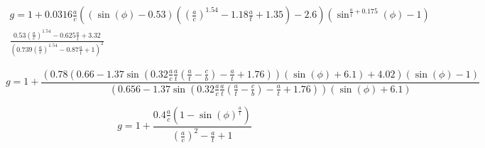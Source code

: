 \begin{equation} \label{eqn:Bingo_g_matching_complexity}
\begin{gathered}
   g = 1 + 0.0316 \frac{a}{c} \left( \left( \sin\left(\phi\right) - 0.53 \right) \left( \left( \frac{a}{c} \right) ^ 1.54 - 1.18 \frac{a}{t} + 1.35 \right) - 2.6 \right) \left( \sin ^{\frac{a}{t} + 0.175}\left(\phi\right) - 1 \right) \\
   \frac{0.53 \left( \frac{a}{c} \right) ^ 1.54 - 0.625 \frac{a}{t} + 3.32}{\left( 0.739 \left( \frac{a}{c} \right) ^ 1.54 - 0.87 \frac{a}{t} + 1 \right) ^ 2} 
\end{gathered}
\end{equation}

\begin{equation} \label{eqn:Bingo_g_matching_complexity_with_cb}
    g = 1 + \frac{{\left({0.78}{\left({0.66}-{1.37} \sin{{\left({0.32}\frac{a}{{c}}\frac{a}{{t}}{\left(\frac{a}{{t}}-\frac{c}{{b}}\right)}-\frac{a}{{t}}+{1.76}\right)}}\right)}{\left( \sin{{\left(\phi\right)}}+{6.1}\right)}+{4.02}\right)}{\left( \sin{{\left(\phi\right)}}-{1}\right)}}{{{\left({0.656}-{1.37} \sin{{\left({0.32}\frac{a}{{c}}\frac{a}{{t}}{\left(\frac{a}{{t}}-\frac{c}{{b}}\right)}-\frac{a}{{t}}+{1.76}\right)}}\right)}{\left( \sin{{\left(\phi\right)}}+{6.1}\right)}}}
\end{equation}

\begin{equation} \label{eqn:Bingo_g_balance}
    g = 1 + \frac{0.4 \frac{a}{c}\left(1 - \sin\left(\phi\right) ^ \frac{a}{t} \right)}{\left( \frac{a}{c} \right) ^ 2 - \frac{a}{t} + 1}
\end{equation}

